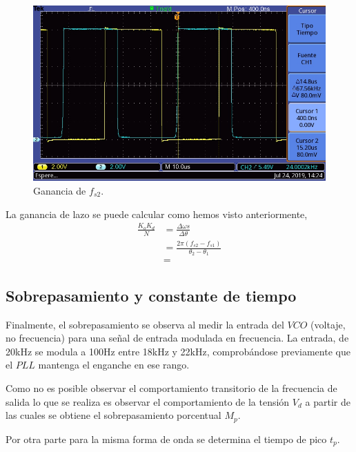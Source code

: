 \documentclass[twocolumn]{article}
\begin{document}
\begin{figure}[H]
  \centering    
  \includegraphics[width=\columnwidth]{imagenes/osc2.jpg}
  \caption{Ganancia de $f_{s2}$.}\label{fig:osc2}
\end{figure}

La ganancia de lazo se puede calcular como hemos visto anteriormente,
\begin{align*}
	\frac{K_o K_d}{N} &= \frac{\Delta \omega s}{\Delta \theta} \\
					  &= \frac{2 \pi (f_{s2} - f_{s1})} {\theta_2 - \theta_1} \\
					  &= 
\end{align*}

\subsection{Sobrepasamiento y constante de tiempo}
Finalmente, el sobrepasamiento se observa al medir la entrada del $VCO$ (voltaje, no frecuencia) para una señal de entrada modulada en frecuencia. La entrada, de 20kHz se modula a 100Hz entre 18kHz y 22kHz, comprobándose previamente que el $PLL$ mantenga el enganche en ese rango.

Como no es posible observar el comportamiento transitorio de la frecuencia de salida lo que se realiza es observar el comportamiento de la tensión $V_d$ a partir de las cuales se obtiene el sobrepasamiento porcentual $M_{p}$.

Por otra parte para la misma forma de onda se determina el tiempo de pico $t_p$. 
\end{document}
